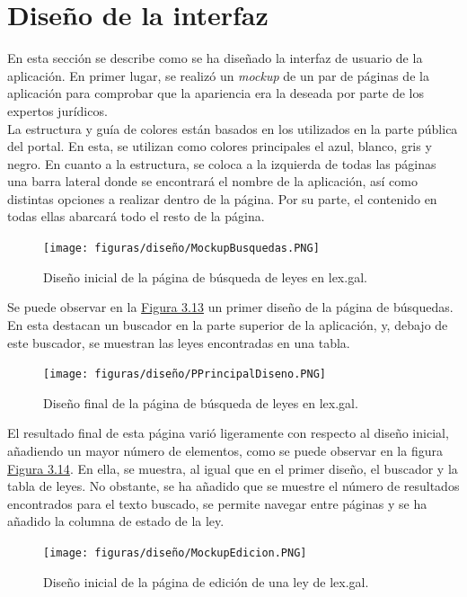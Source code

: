 \section{Diseño de la interfaz}

En esta sección se describe como se ha diseñado la interfaz de usuario de la aplicación. En primer lugar, se realizó un {\it mockup} \cite{mockup} de un par de páginas de la aplicación para comprobar que la apariencia era la deseada por parte de los expertos jurídicos.
\\

La estructura y guía de colores están basados en los utilizados en la parte pública del portal. En esta, se utilizan como colores principales el azul, blanco, gris y negro. En cuanto a la estructura, se coloca a la izquierda de todas las páginas una barra lateral donde se encontrará el nombre de la aplicación, así como distintas opciones a realizar dentro de la página. Por su parte, el contenido en todas ellas abarcará todo el resto de la página.

\begin{figure}[H]
\centerline{\texttt{[image: figuras/diseño/MockupBusquedas.PNG]}}
\caption{Diseño inicial de la página de búsqueda de leyes en lex.gal.}
\label{enlaceMockupPrincipalDiseno}
\end{figure}

Se puede observar en la \hyperref[enlaceMockupPrincipalDiseno]{Figura 3.13} un primer diseño de la página de búsquedas. En esta destacan un buscador en la parte superior de la aplicación, y, debajo de este buscador, se muestran las leyes encontradas en una tabla.

\begin{figure}[H]
\centerline{\texttt{[image: figuras/diseño/PPrincipalDiseno.PNG]}}
\caption{Diseño final de la página de búsqueda de leyes en lex.gal.}
\label{enlacePPrincipalDiseno}
\end{figure}

El resultado final de esta página varió ligeramente con respecto al diseño inicial, añadiendo un mayor número de elementos, como se puede observar en la figura \hyperref[enlacePPrincipalDiseno]{Figura 3.14}. En ella, se muestra, al igual que en el primer diseño, el buscador y la tabla de leyes. No obstante, se ha añadido que se muestre el número de resultados encontrados para el texto buscado, se permite navegar entre páginas y se ha añadido la columna de estado de la ley.

\begin{figure}[H]
\centerline{\texttt{[image: figuras/diseño/MockupEdicion.PNG]}}
\caption{Diseño inicial de la página de edición de una ley de lex.gal.}
\label{enlaceMockupEdicionDiseno}
\end{figure}

